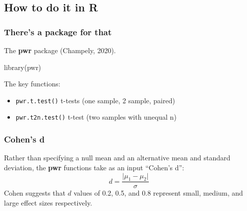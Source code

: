 \documentclass[a4paper]{article}
\begin{document}
\subsection{How to do it in R}
\subsubsection{There's a package for that}
The \textcolor{myred}{\textbf{pwr}} package (Champely, 2020).
\begin{Schunk}
\begin{Sinput}
library(pwr) 
\end{Sinput}
\end{Schunk}
The key functions:
\begin{itemize}
	\item \lstinline|pwr.t.test()| t-tests (one sample, 2 sample, paired)
	\item \lstinline|pwr.t2n.test()| t-test (two samples with unequal n)
\end{itemize}
\subsubsection{Cohen's d}
Rather than specifying a null mean and an alternative mean and standard deviation, the \textbf{pwr} functions take as an input ``Cohen's d'':
\[
	d = \frac{\lvert \mu_1 - \mu_2 \rvert}{\sigma}
\]
Cohen suggests that \( d \) values of 0.2, 0.5, and 0.8 represent small, medium, and large effect sizes respectively.
\end{document}
